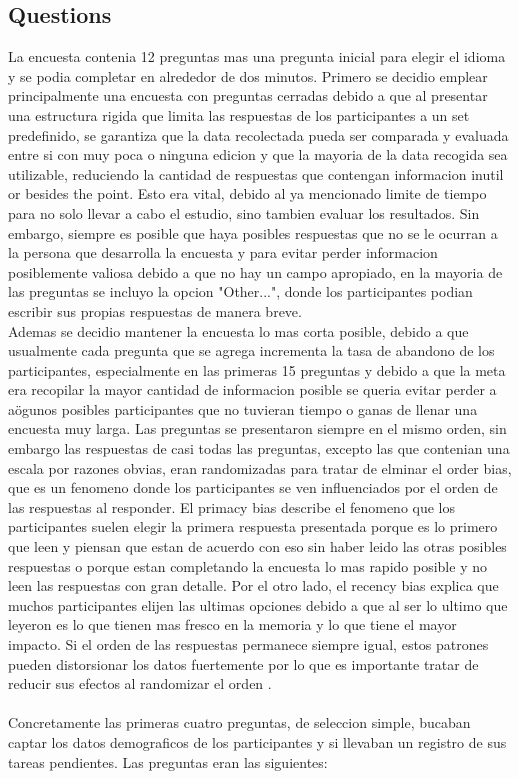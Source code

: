 \subsection{Questions}
La encuesta contenia 12 preguntas mas una pregunta inicial para elegir el idioma y se podia completar en alrededor de dos minutos. Primero se decidio emplear principalmente una encuesta con preguntas cerradas debido a que al presentar una estructura rigida que limita las respuestas de los participantes a un set predefinido, se garantiza que la data recolectada pueda ser comparada y evaluada entre si con muy poca o ninguna edicion y que la mayoria de la data recogida sea utilizable, reduciendo la cantidad de respuestas que contengan informacion inutil or besides the point\cite{usabilityUXBook}. Esto era vital, debido al ya mencionado limite de tiempo para no solo llevar a cabo el estudio, sino tambien evaluar los resultados.  Sin embargo, siempre es posible que haya posibles respuestas que no se le ocurran a la persona que desarrolla la encuesta y para evitar perder informacion posiblemente valiosa debido a que no hay un campo apropiado, en la mayoria de las preguntas se incluyo la opcion "Other...", donde los participantes podian escribir sus propias respuestas de manera breve.\\  
Ademas se decidio mantener la encuesta lo mas corta posible, debido a que usualmente cada pregunta que se agrega incrementa la tasa de abandono de los participantes, especialmente en las primeras 15 preguntas\cite{SurveyMonkeySurveyLength} y debido a que la meta era recopilar la mayor cantidad de informacion posible se queria evitar perder a aögunos posibles participantes que no tuvieran tiempo o ganas de llenar una encuesta muy larga. Las preguntas se presentaron siempre en el mismo orden, sin embargo las respuestas de casi todas las preguntas, excepto las que contenian una escala por razones obvias, eran randomizadas para tratar de elminar el order bias, que es un fenomeno donde los participantes se ven influenciados por el orden de las respuestas al responder. El primacy bias describe el fenomeno que los participantes suelen elegir la primera respuesta presentada porque es lo primero que leen y piensan que estan de acuerdo con eso sin haber leido las otras posibles respuestas o porque estan completando la encuesta lo mas rapido posible y no leen las respuestas con gran detalle. Por el otro lado, el recency bias explica que muchos participantes elijen las ultimas opciones debido a que al ser lo ultimo que leyeron es lo que tienen mas fresco en la memoria y lo que tiene el mayor impacto. Si el orden de las respuestas permanece siempre igual, estos patrones pueden distorsionar los datos fuertemente por lo que es importante tratar de reducir sus efectos al randomizar el orden \cite{SurveyMonkeyOrderBias}.\\
\\
Concretamente las primeras cuatro preguntas, de seleccion simple, bucaban captar los datos demograficos de los participantes y si llevaban un registro de sus tareas pendientes. Las preguntas eran las siguientes: 

